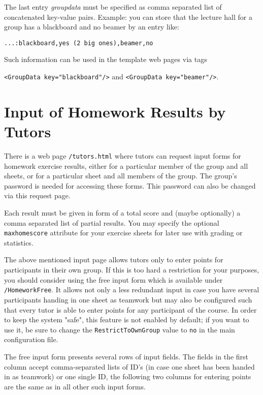 \documentclass[12pt,openany,a4paper]{book}
\begin{document}
The last entry \emph{groupdata} must be specified as comma separated list of
concatenated key-value pairs. Example: you can store that the lecture hall
for a group has a blackboard and no beamer by an entry like:

\hspace*{5mm} \verb!...:blackboard,yes (2 big ones),beamer,no!

Such information can be used in the template web pages via tags

\hspace*{5mm} \verb!<GroupData key="blackboard"/>! and 
\verb!<GroupData key="beamer"/>!.


\section{Input of Homework Results by Tutors}
\label{sec:tutpage}

There is a web page \texttt{/tutors.html} where tutors can request input
forms for homework exercise results, either for a particular member of the
group and all sheets, or for a particular sheet and all members of the
group. The group's password is needed for accessing these forms. This
password can also be changed via this request page.

Each result must be given in form of a total score and (maybe optionally) a
comma separated  list of partial results. You may specify the optional
\texttt{maxhomescore} attribute for your exercise sheets for later use with
grading or statistics.

The above mentioned input page allows tutors only to enter points for
participants in their own group. If this is too hard a restriction for
your purposes, you should consider using the free input form which
is available under \texttt{/HomeworkFree}. It allows not only a less
redundant input in case you have several participants handing in one
sheet as teamwork but may also be configured such that every
tutor is able to enter points for any participant of the course. In
order to keep the system "safe", this feature is not enabled by default;
if you want to use it, be sure to change the \texttt{RestrictToOwnGroup} 
value to \texttt{no} in the main configuration file.

The free input form presents several rows of input fields. The fields
in the first column accept comma-separated lists of ID's (in case one
sheet has been handed in as teamwork) or one single ID, the following
two columns for entering points are the same as in all other such input
forms.
\end{document}
